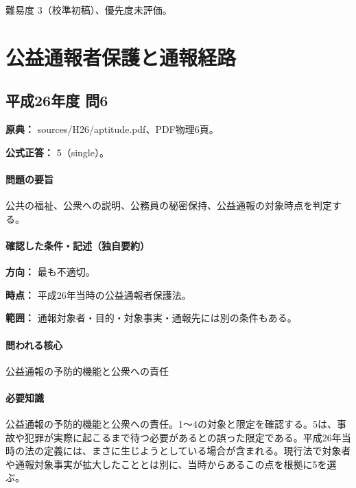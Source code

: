 \par 難易度 3（校準初稿）、優先度未評価。

\section{公益通報者保護と通報経路}

\subsection{平成26年度 問6}
\label{q:h26-reg-apt-06}

\noindent\textbf{原典：} sources/H26/aptitude.pdf、PDF物理6頁。

\textbf{公式正答：} 5（single）。

\paragraph{問題の要旨} 公共の福祉、公衆への説明、公務員の秘密保持、公益通報の対象時点を判定する。

\paragraph{確認した条件・記述（独自要約）}\mbox{}\par

\noindent\textbf{方向：} 最も不適切。\par

\noindent\textbf{時点：} 平成26年当時の公益通報者保護法。\par

\noindent\textbf{範囲：} 通報対象者・目的・対象事実・通報先には別の条件もある。\par

\paragraph{問われる核心} 公益通報の予防的機能と公衆への責任

\paragraph{必要知識} 公益通報の予防的機能と公衆への責任。1〜4の対象と限定を確認する。5は、事故や犯罪が実際に起こるまで待つ必要があるとの誤った限定である。平成26年当時の法の定義には、まさに生じようとしている場合が含まれる。現行法で対象者や通報対象事実が拡大したこととは別に、当時からあるこの点を根拠に5を選ぶ。

